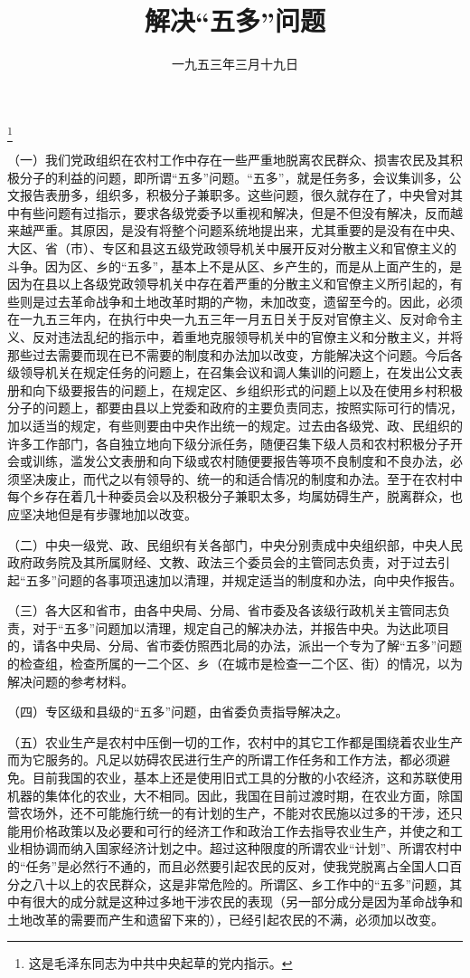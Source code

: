 
\title{解决“五多”问题}
\date{一九五三年三月十九日}
\thanks{这是毛泽东同志为中共中央起草的党内指示。}
\maketitle


（一）我们党政组织在农村工作中存在一些严重地脱离农民群众、损害农民及其积极分子的利益的问题，即所谓“五多”问题。“五多”，就是任务多，会议集训多，公文报告表册多，组织多，积极分子兼职多。这些问题，很久就存在了，中央曾对其中有些问题有过指示，要求各级党委予以重视和解决，但是不但没有解决，反而越来越严重。其原因，是没有将整个问题系统地提出来，尤其重要的是没有在中央、大区、省（市）、专区和县这五级党政领导机关中展开反对分散主义和官僚主义的斗争。因为区、乡的“五多”，基本上不是从区、乡产生的，而是从上面产生的，是因为在县以上各级党政领导机关中存在着严重的分散主义和官僚主义所引起的，有些则是过去革命战争和土地改革时期的产物，未加改变，遗留至今的。因此，必须在一九五三年内，在执行中央一九五三年一月五日关于反对官僚主义、反对命令主义、反对违法乱纪的指示中，着重地克服领导机关中的官僚主义和分散主义，并将那些过去需要而现在已不需要的制度和办法加以改变，方能解决这个问题。今后各级领导机关在规定任务的问题上，在召集会议和调人集训的问题上，在发出公文表册和向下级要报告的问题上，在规定区、乡组织形式的问题上以及在使用乡村积极分子的问题上，都要由县以上党委和政府的主要负责同志，按照实际可行的情况，加以适当的规定，有些则要由中央作出统一的规定。过去由各级党、政、民组织的许多工作部门，各自独立地向下级分派任务，随便召集下级人员和农村积极分子开会或训练，滥发公文表册和向下级或农村随便要报告等项不良制度和不良办法，必须坚决废止，而代之以有领导的、统一的和适合情况的制度和办法。至于在农村中每个乡存在着几十种委员会以及积极分子兼职太多，均属妨碍生产，脱离群众，也应坚决地但是有步骤地加以改变。

（二）中央一级党、政、民组织有关各部门，中央分别责成中央组织部，中央人民政府政务院及其所属财经、文教、政法三个委员会的主管同志负责，对于过去引起“五多”问题的各事项迅速加以清理，并规定适当的制度和办法，向中央作报告。

（三）各大区和省市，由各中央局、分局、省市委及各该级行政机关主管同志负责，对于“五多”问题加以清理，规定自己的解决办法，并报告中央。为达此项目的，请各中央局、分局、省市委仿照西北局的办法，派出一个专为了解“五多”问题的检查组，检查所属的一二个区、乡（在城市是检查一二个区、街）的情况，以为解决问题的参考材料。

（四）专区级和县级的“五多”问题，由省委负责指导解决之。

（五）农业生产是农村中压倒一切的工作，农村中的其它工作都是围绕着农业生产而为它服务的。凡足以妨碍农民进行生产的所谓工作任务和工作方法，都必须避免。目前我国的农业，基本上还是使用旧式工具的分散的小农经济，这和苏联使用机器的集体化的农业，大不相同。因此，我国在目前过渡时期，在农业方面，除国营农场外，还不可能施行统一的有计划的生产，不能对农民施以过多的干涉，还只能用价格政策以及必要和可行的经济工作和政治工作去指导农业生产，并使之和工业相协调而纳入国家经济计划之中。超过这种限度的所谓农业“计划”、所谓农村中的“任务”是必然行不通的，而且必然要引起农民的反对，使我党脱离占全国人口百分之八十以上的农民群众，这是非常危险的。所谓区、乡工作中的“五多”问题，其中有很大的成分就是这种过多地干涉农民的表现（另一部分成分是因为革命战争和土地改革的需要而产生和遗留下来的），已经引起农民的不满，必须加以改变。
